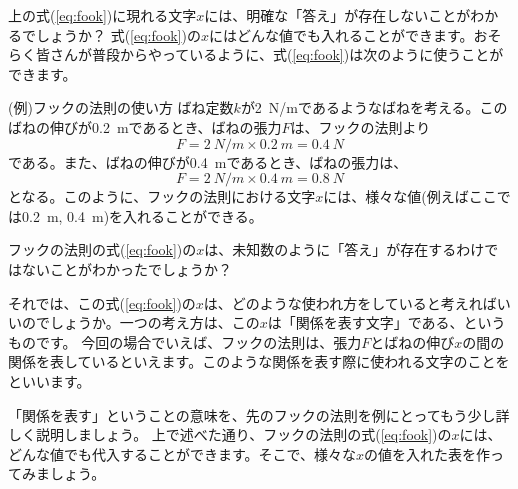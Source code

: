 \documentclass[uplatex,dvipdfmx]{jsarticle}
\begin{document}
	上の式(\ref{eq:fook})に現れる文字$x$には、明確な「答え」が存在しないことがわかるでしょうか？
	式(\ref{eq:fook})の$x$にはどんな値でも入れることができます。おそらく皆さんが普段からやっているように、式(\ref{eq:fook})は次のように使うことができます。
	
	\begin{itembox}[l]{(例)フックの法則の使い方}
		ばね定数$k$が\SI{2}{N/m}であるようなばねを考える。このばねの伸びが\SI{0.2}{m}であるとき、ばねの張力$F$は、フックの法則より
		\begin{equation}
			F = \SI{2}{N/m} \times \SI{0.2}{m} = \SI{0.4}{N}
		\end{equation}
		である。また、ばねの伸びが\SI{0.4}{m}であるとき、ばねの張力は、
		\begin{equation}
			F = \SI{2}{N/m} \times \SI{0.4}{m} = \SI{0.8}{N}
		\end{equation}
		となる。このように、フックの法則における文字$x$には、様々な値(例えばここでは\SI{0.2}{m}, \SI{0.4}{m})を入れることができる。
	\end{itembox}
	
	フックの法則の式(\ref{eq:fook})の$x$は、未知数のように「答え」が存在するわけではないことがわかったでしょうか？

	それでは、この式(\ref{eq:fook})の$x$は、どのような使われ方をしていると考えればいいのでしょうか。一つの考え方は、この$x$は「関係を表す文字」である、というものです。
	今回の場合でいえば、フックの法則は、張力$F$とばねの伸び$x$の間の関係を表しているといえます。このような関係を表す際に使われる文字のことをといいます。
	
	\vspace{0.5cm}

	「関係を表す」ということの意味を、先のフックの法則を例にとってもう少し詳しく説明しましょう。
	上で述べた通り、フックの法則の式(\ref{eq:fook})の$x$には、どんな値でも代入することができます。そこで、様々な$x$の値を入れた表を作ってみましょう。
\end{document}
